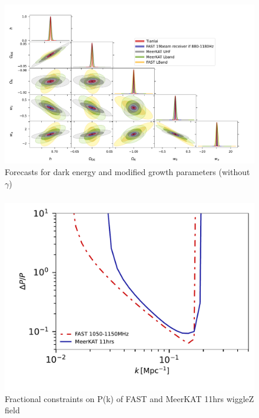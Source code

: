 \documentclass[UTF8]{beamer}
\begin{document}
    \begin{frame}
        \frametitle{}
        \begin{figure}
            \centering
            \includegraphics[scale=0.27]{fig17-6params-eos-withTianlai.pdf}
            \caption{Forecasts for dark energy and modified growth parameters (without $\gamma$)}
        \end{figure}
    \end{frame}
    \begin{frame}
        \frametitle{}
        \begin{figure}
            \centering
            \includegraphics[scale=0.4]{fig04-dlogp-FAST-Meerkat.pdf}
            \caption{Fractional constraints on P(k) of FAST and MeerKAT 11hrs wiggleZ field}
        \end{figure}
    \end{frame}
\end{document}
